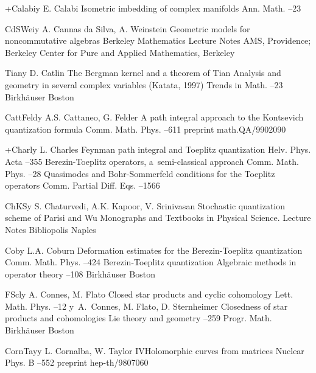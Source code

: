 \documentclass[12pt]{amsart}
\numberwithin{equation}{section}
\theoremstyle{remark}
\newcommand{\by}{\mathbf y}
\begin{document}
\begin{thebibliography}{199}
 +Calabi\by{ E. Calabi \paper Isometric imbedding of complex manifolds
\jour Ann. Math.   --23}

 CdSWei\by{ A. Cannas da Silva, A. Weinstein \book Geometric models for
noncommutative algebras \bookinfo Berkeley Mathematics Lecture Notes 
\publ AMS, Providence; Berkeley Center for Pure and Applied Mathematics,
Berkeley }

 Tian\by{ D. Catlin \paper The Bergman kernel and a theorem of Tian
\inbook Analysis and geometry in several complex variables (Katata, 1997)
\bookinfo Trends in Math. --23 \publ Birkh\"auser \publaddr Boston
}

 CattFeld\by{ A.S. Cattaneo, G. Felder \paper A path integral approach to
the Kontsevich quantization formula \jour Comm. Math. Phys.  
--611 \paperinfo preprint math.QA/9902090}

 +Charl\by{ L. Charles \paper Feynman path integral and Toeplitz
quantization \jour Helv. Phys. Acta   --355 \moreref
\paper Berezin-Toeplitz operators, a~semi-classical approach \jour Comm. Math.
Phys.   --28 \moreref \paper Quasimodes and
Bohr-Sommerfeld conditions for the Toeplitz operators \jour Comm. Partial Diff.
Eqs.   --1566}

 ChKS\by{ S. Chaturvedi, A.K. Kapoor, V. Srinivasan \book Stochastic
quantization scheme of Parisi and Wu \bookinfo Monographs and Textbooks in
Physical Science. Lecture Notes  \publ Bibliopolis \publaddr Naples }

 Cob\by{ L.A. Coburn \paper Deformation estimates for the Berezin-Toeplitz
quantization \jour Comm. Math. Phys.   --424 \moreref
\paper Berezin-Toeplitz quantization \inbook Algebraic methods in operator
theory --108 \publ Birkh\"auser \publaddr Boston }

 FScl\by{ A. Connes, M. Flato \paper Closed star products and cyclic
cohomology \jour Lett. Math. Phys.   --12 \moreref
\by \  A.~Connes, M. Flato, D. Sternheimer \paper Closedness of star products
and cohomologies \inbook Lie theory and geometry --259 \bookinfo
Progr. Math.  \publ Birkh\"auser \publaddr Boston }

 CornTay\by{ L. Cornalba, W. Taylor IV\paper Holomorphic curves from
matrices \jour Nuclear Phys. B   --552 \paperinfo
preprint hep-th/9807060}


\end{thebibliography}
\end{document}
